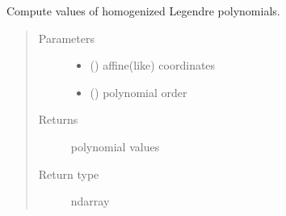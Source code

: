 \documentclass[letterpaper,10pt,english]{sphinxmanual}
\begin{document}
\begin{fulllineitems}
\label{\detokenize{petgem/hvfem:petgem.hvfem.HomLegendre}}
Compute values of homogenized Legendre polynomials.
\begin{quote}\begin{description}
\item[{Parameters}] \leavevmode\begin{itemize}
\item {} 
 () \textendash{} affine(like) coordinates

\item {} 
 () \textendash{} polynomial order

\end{itemize}

\item[{Returns}] \leavevmode
polynomial values

\item[{Return type}] \leavevmode
ndarray

\end{description}\end{quote}

\end{fulllineitems}

\end{document}
